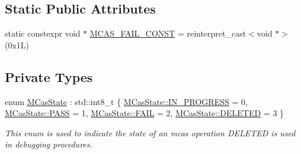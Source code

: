 \subsection*{Static Public Attributes}
\begin{DoxyCompactItemize}
\item 
static constexpr void $\ast$ \hyperlink{classtervel_1_1algorithms_1_1wf_1_1mcas_1_1_multi_word_compare_and_swap_a7f918a073a882ba1219855a9e03db2f6}{M\+C\+A\+S\+\_\+\+F\+A\+I\+L\+\_\+\+C\+O\+N\+S\+T} = reinterpret\+\_\+cast$<$void $\ast$$>$(0x1\+L)
\end{DoxyCompactItemize}
\subsection*{Private Types}
\begin{DoxyCompactItemize}
\item 
enum \hyperlink{classtervel_1_1algorithms_1_1wf_1_1mcas_1_1_multi_word_compare_and_swap_acc59b33256be2492c2d576bd1b770027}{M\+Cas\+State} \+: std\+::int8\+\_\+t \{ \hyperlink{classtervel_1_1algorithms_1_1wf_1_1mcas_1_1_multi_word_compare_and_swap_acc59b33256be2492c2d576bd1b770027aca69f96c768067fbff6c911ca87bccc9}{M\+Cas\+State\+::\+I\+N\+\_\+\+P\+R\+O\+G\+R\+E\+S\+S} = 0, 
\hyperlink{classtervel_1_1algorithms_1_1wf_1_1mcas_1_1_multi_word_compare_and_swap_acc59b33256be2492c2d576bd1b770027a7a95bf926a0333f57705aeac07a362a2}{M\+Cas\+State\+::\+P\+A\+S\+S} = 1, 
\hyperlink{classtervel_1_1algorithms_1_1wf_1_1mcas_1_1_multi_word_compare_and_swap_acc59b33256be2492c2d576bd1b770027ac2759effffc94bb9acc71d69fe3e8a1f}{M\+Cas\+State\+::\+F\+A\+I\+L} = 2, 
\hyperlink{classtervel_1_1algorithms_1_1wf_1_1mcas_1_1_multi_word_compare_and_swap_acc59b33256be2492c2d576bd1b770027a63c2867fdcae0e8e8413d7ac21b69b59}{M\+Cas\+State\+::\+D\+E\+L\+E\+T\+E\+D} = 3
 \}\begin{DoxyCompactList}\small\item\em This enum is used to indicate the state of an mcas operation D\+E\+L\+E\+T\+E\+D is used in debugging procedures. \end{DoxyCompactList}
\end{DoxyCompactItemize}
